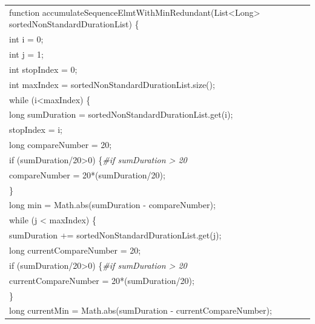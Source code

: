 \documentclass[a4paper, 13pt]{report}
\begin{document}
\begin{enumerate}[label=\textbf{PL\arabic*}]
\begin{flushleft}
\begin{tabular}{ |l| }
\hline
function accumulateSequenceElmtWithMinRedundant(List<Long> sortedNonStandardDurationList) \{\\
\hspace{0.5cm} int i = 0;\\
\hspace{0.5cm} int j = 1;\\
\hspace{0.5cm} int stopIndex = 0;\\
\hspace{0.5cm} int maxIndex = sortedNonStandardDurationList.size();\\
\hspace{0.5cm} while (i<maxIndex) \{\\
\hspace{1cm} long sumDuration = sortedNonStandardDurationList.get(i);\\
\hspace{1cm} stopIndex = i;\\
\hspace{1cm} long compareNumber = 20;\\
\hspace{1cm} if (sumDuration/20>0) \{\textit{\#if sumDuration > 20}\\
\hspace{1.5cm}   compareNumber = 20*(sumDuration/20);\\
\hspace{1cm} \}\\
\hspace{1cm} long min = Math.abs(sumDuration - compareNumber);\\
\hspace{1cm} while (j < maxIndex) \{\\
\hspace{1.5cm}   sumDuration += sortedNonStandardDurationList.get(j);\\
\hspace{1.5cm}   long currentCompareNumber = 20;\\
\hspace{1.5cm}   if (sumDuration/20>0) \{\textit{\#if sumDuration > 20}\\
\hspace{2cm}          currentCompareNumber = 20*(sumDuration/20);\\
\hspace{1.5cm}   \}\\
\hspace{1.5cm}   long currentMin = Math.abs(sumDuration - currentCompareNumber);\\

\end{tabular}
\end{flushleft}
\end{enumerate}
\end{document}
